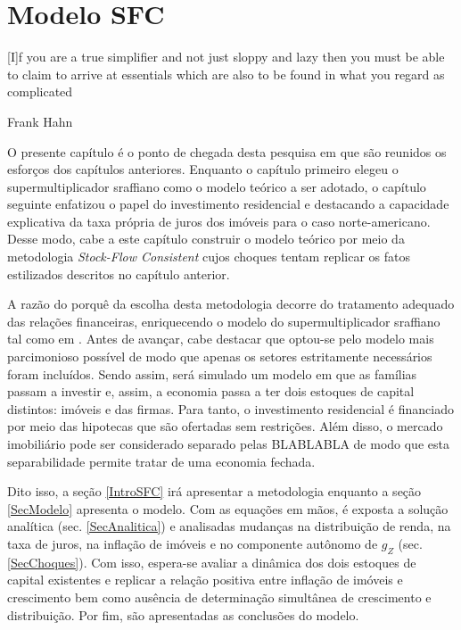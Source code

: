 
\chapter{Modelo SFC}\label{CapModelo}

\epigraph{[I]f you are a true simplifier and not just
sloppy and lazy then you must be able to claim to arrive at essentials which are also to be
found in what you regard as complicated}{Frank Hahn}

O presente capítulo é o ponto de chegada desta pesquisa em que são reunidos os esforços dos capítulos anteriores. Enquanto o capítulo primeiro elegeu o supermultiplicador sraffiano como o modelo teórico a ser adotado, o capítulo seguinte  enfatizou o papel do investimento residencial e destacando a capacidade explicativa da taxa própria de juros dos imóveis para o caso norte-americano. Desse modo, cabe a este capítulo construir o modelo teórico por meio da metodologia \textit{Stock-Flow Consistent} cujos choques tentam replicar os fatos estilizados descritos no capítulo anterior.

A razão do porquê da escolha desta metodologia decorre do tratamento adequado das relações financeiras, enriquecendo o modelo do supermultiplicador sraffiano tal como em \textcite{brochier_supermultiplier_2018}. Antes de avançar, cabe destacar que optou-se pelo modelo mais parcimonioso possível de modo que apenas os setores estritamente necessários foram incluídos. Sendo assim, será simulado um modelo em que as famílias passam a investir e, assim, a economia passa a ter dois estoques de capital distintos: imóveis e das firmas. Para tanto, o investimento residencial é financiado por meio das hipotecas que são ofertadas sem restrições. 
Além disso, o mercado imobiliário pode ser considerado separado pelas BLABLABLA de modo que esta separabilidade permite tratar de uma economia fechada.


Dito isso, a seção \ref{IntroSFC} irá apresentar a metodologia enquanto a seção \ref{SecModelo} apresenta o modelo. Com as equações em mãos, é exposta a solução analítica (sec. \ref{SecAnalitica}) e analisadas mudanças na distribuição de renda, na taxa de juros, na inflação de imóveis e no componente autônomo de $g_Z$ (sec. \ref{SecChoques}). Com isso, espera-se avaliar a dinâmica dos dois estoques de capital existentes e replicar a relação positiva entre inflação de imóveis e crescimento bem como ausência de determinação simultânea de crescimento e distribuição.
Por fim, são apresentadas as conclusões do modelo.






